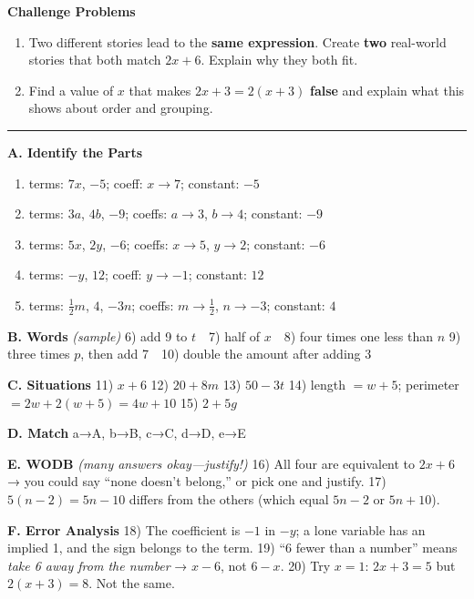 \documentclass[
  letterpaper,
  DIV=11,
  numbers=noendperiod]{scrreprt}
\providecommand{\tightlist}{%
  \setlength{\itemsep}{0pt}\setlength{\parskip}{0pt}}
\begin{document}
\textbf{Challenge Problems}

\begin{enumerate}
\def\labelenumi{\arabic{enumi}.}
\setcounter{enumi}{23}
\tightlist
\item
  Two different stories lead to the \textbf{same expression}. Create
  \textbf{two} real-world stories that both match \(2x + 6\). Explain
  why they both fit.
\item
  Find a value of \(x\) that makes \(2x + 3 = 2(x + 3)\) \textbf{false}
  and explain what this shows about order and grouping.
\end{enumerate}

\begin{center}\rule{0.5\linewidth}{0.5pt}\end{center}

\textbf{A. Identify the Parts}

\begin{enumerate}
\def\labelenumi{\arabic{enumi}.}
\tightlist
\item
  terms: \(7x\), \(-5\); coeff: \(x\to 7\); constant: \(-5\)
\item
  terms: \(3a\), \(4b\), \(-9\); coeffs: \(a\to 3\), \(b\to 4\);
  constant: \(-9\)
\item
  terms: \(5x\), \(2y\), \(-6\); coeffs: \(x\to 5\), \(y\to 2\);
  constant: \(-6\)
\item
  terms: \(-y\), \(12\); coeff: \(y\to -1\); constant: \(12\)
\item
  terms: \(\tfrac12 m\), \(4\), \(-3n\); coeffs: \(m\to \tfrac12\),
  \(n\to -3\); constant: \(4\)
\end{enumerate}

\textbf{B. Words} \emph{(sample)} 6) add 9 to \(t\) 7) half of \(x\) 8)
four times one less than \(n\) 9) three times \(p\), then add 7 10)
double the amount after adding 3

\textbf{C. Situations} 11) \(x+6\) 12) \(20+8m\) 13) \(50-3t\) 14)
length \(= w+5\); perimeter \(= 2w + 2(w+5) = 4w+10\) 15) \(2+5g\)

\textbf{D. Match} a→A, b→B, c→C, d→D, e→E

\textbf{E. WODB} \emph{(many answers okay---justify!)} 16) All four are
equivalent to \(2x+6\) → you could say ``none doesn't belong,'' or pick
one and justify. 17) \(5(n-2)=5n-10\) differs from the others (which
equal \(5n-2\) or \(5n+10\)).

\textbf{F. Error Analysis} 18) The coefficient is \(-1\) in \(-y\); a
lone variable has an implied 1, and the sign belongs to the term. 19)
``6 fewer than a number'' means \emph{take 6 away from the number} →
\(x-6\), not \(6-x\). 20) Try \(x=1\): \(2x+3=5\) but \(2(x+3)=8\). Not
the same.
\end{document}
